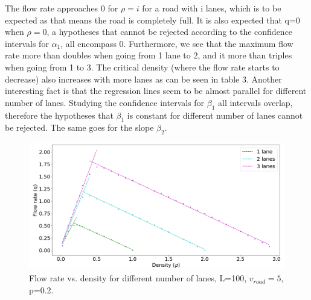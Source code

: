 \documentclass[a4paper,12pt]{article}
\begin{document}
The flow rate approaches 0 for $\rho=i$ for a road with i lanes, which is to be expected as that means the road is completely full. It is also expected that q=0 when $\rho=0$, a hypotheses that cannot be rejected according to the confidence intervals for $\alpha_1$, all encompass 0. Furthermore, we see that the maximum flow rate more than doubles when going from 1 lane to 2, and it more than triples when going from 1 to 3. The critical density (where the flow rate starts to decrease) also increases with more lanes as can be seen in table 3. Another interesting fact is that the regression lines seem to be almost parallel for different number of lanes. Studying the confidence intervals for $\beta_1$ all intervals overlap, therefore the hypotheses that $\beta_1$ is constant for different number of lanes cannot be rejected. The same goes for the slope $\beta_2$.
\begin{figure}[H]
	\centering
        \includegraphics[scale=0.4]{fig22.png}
    \caption{Flow rate vs. density for different number of lanes, L=100, $v_{road}=5$, p=0.2.}
    \label{fig2}
\end{figure}
\end{document}

